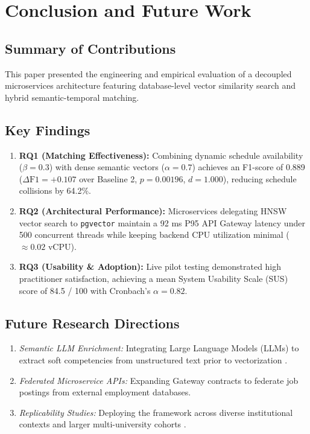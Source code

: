 \documentclass[a4paper,fleqn]{cas-dc}
\begin{document}
\section{Conclusion and Future Work}
\label{sec:conclusion}

\subsection{Summary of Contributions}
This paper presented the engineering and empirical evaluation of a decoupled microservices architecture featuring database-level vector similarity search and hybrid semantic-temporal matching.

\subsection{Key Findings}
\begin{enumerate}
    \item \textbf{RQ1 (Matching Effectiveness):} Combining dynamic schedule availability ($\beta = 0.3$) with dense semantic vectors ($\alpha = 0.7$) achieves an F1-score of 0.889 ($\Delta\text{F1} = +0.107$ over Baseline 2, $p = 0.00196$, $d = 1.000$), reducing schedule collisions by 64.2\%.
    \item \textbf{RQ2 (Architectural Performance):} Microservices delegating HNSW vector search to \texttt{pgvector} maintain a 92 ms P95 API Gateway latency under 500 concurrent threads while keeping backend CPU utilization minimal ($\approx 0.02$ vCPU).
    \item \textbf{RQ3 (Usability \& Adoption):} Live pilot testing demonstrated high practitioner satisfaction, achieving a mean System Usability Scale (SUS) score of 84.5 / 100 with Cronbach's $\alpha = 0.82$.
\end{enumerate}

\subsection{Future Research Directions}
\begin{enumerate}
    \item \textit{Semantic LLM Enrichment:} Integrating Large Language Models (LLMs) to extract soft competencies from unstructured text prior to vectorization \cite{bisschoff2025}.
    \item \textit{Federated Microservice APIs:} Expanding Gateway contracts to federate job postings from external employment databases.
    \item \textit{Replicability Studies:} Deploying the framework across diverse institutional contexts and larger multi-university cohorts \cite{song2022, dlouhy2025}.
\end{enumerate}
\end{document}

